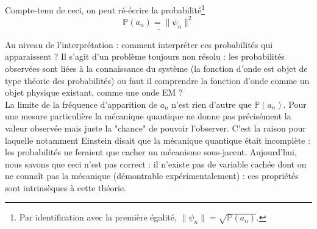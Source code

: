  Compte-tenu de ceci, on peut ré-écrire la probabilité\footnote{Par identification avec 
 la première égalité, $\|\psi_n\| = \sqrt{\mathbb{P}(a_n)}$.}
 \begin{equation}
 \underline{\mathbb{P}(a_n) = \|\psi_n\|^2}
 \end{equation}
 
 Au niveau de l'interprétation : comment interpréter ces probabilités 
 qui apparaissent ? Il s'agit d'un problème toujours non résolu : les probabilités 
 observées sont liées à la connaissance du système (la fonction d'onde est objet de type 
 théorie des probabilités) ou faut il comprendre la fonction d'onde comme un objet 
 physique existant, comme une onde EM ? \\
  
 La limite de la fréquence d'apparition de $a_n$ n'est rien d'autre que 
 $\mathbb{P}(a_n)$. Pour une mesure particulière la mécanique quantique ne 
 donne pas précisément  la valeur observée mais juste la "chance" de pouvoir 
 l'observer. C'est la raison pour laquelle notamment Einstein disait que la 
 mécanique quantique était incomplète : les probabilités ne feraient que 
 cacher un mécanisme sous-jacent. Aujourd'hui, nous savons que ceci n'est pas 
 correct : il n'existe pas de variable cachée dont on ne connaît pas la 
 mécanique (démontrable expérimentalement) : ces propriétés sont intrinsèques 
 à cette théorie.\\
 
